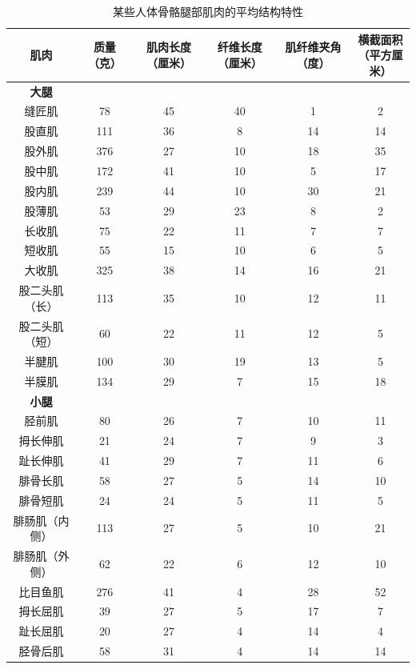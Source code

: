 \begin{table}[htbp]
	\caption{某些人体骨骼腿部肌肉的平均结构特性\label{tab:31_2}}
	\centering
	\begin{tabular}{cccccc}
		\toprule
		肌肉 & 质量（克） & 肌肉长度（厘米） & 纤维长度（厘米） & 肌纤维夹角（度） & \makecell[l]{横截面积\\（平方厘米）} \\
		\midrule
		\textbf{大腿} &   &  & & & \\
		缝匠肌 & 78 & 45 & 40 & 1 & 2 \\
		股直肌 & 111 & 36 & 8 & 14 & 14 \\
		股外肌 & 376 & 27 & 10 & 18 & 35 \\
		股中肌 & 172 & 41 & 10 & 5 & 17 \\
		股内肌 & 239 & 44 & 10 & 30 & 21 \\
		股薄肌 & 53 & 29 & 23 & 8 & 2 \\
		长收肌 & 75 & 22 & 11 & 7 & 7 \\
		短收肌 & 55 & 15 & 10 & 6 & 5 \\
		大收肌 & 325 & 38 & 14 & 16 & 21 \\
		股二头肌（长） & 113 & 35 & 10 & 12 & 11 \\
		股二头肌（短） & 60 & 22 & 11 & 12 & 5 \\
		半腱肌 & 100 & 30 & 19 & 13 & 5 \\
		半膜肌 & 134 & 29 & 7 & 15 & 18 \\
		\textbf{小腿} &   &  & & & \\
		胫前肌 & 80 & 26 & 7 & 10 & 11 \\
		拇长伸肌 & 21 & 24 & 7 & 9 & 3 \\
		趾长伸肌 & 41 & 29 & 7 & 11 & 6 \\
		腓骨长肌 & 58 & 27 & 5 & 14 & 10 \\
		腓骨短肌 & 24 & 24 & 5 & 11 & 5 \\
		腓肠肌（内侧） & 113 & 27 & 5 & 10 & 21 \\
		腓肠肌（外侧） & 62 & 22 & 6 & 12 & 10 \\
		比目鱼肌 & 276 & 41 & 4 & 28 & 52 \\
		拇长屈肌 & 39 & 27 & 5 & 17 & 7 \\
		趾长屈肌 & 20 & 27 & 4 & 14 & 4 \\
		胫骨后肌 & 58 & 31 & 4 & 14 & 14 \\
		\bottomrule
	\end{tabular}
\end{table}


